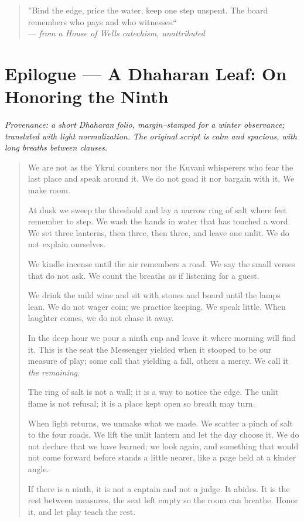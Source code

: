 \documentclass[11pt]{article}
\numberwithin{equation}{section} %
\theoremstyle{plain} %
\theoremstyle{definition} %
\theoremstyle{remark} %
\begin{document}
\medskip
\begin{quote}\small
''Bind the edge, price the water, keep one step unspent. The board remembers who pays and who witnesses.``\\
\hfill --- \textit{from a House of Wells catechism, unattributed}
\end{quote}


\clearpage
\section*{Epilogue --- A Dhaharan Leaf: On Honoring the Ninth}
\label{epilogue:dhahara-ninth}
{}

\noindent\textit{Provenance: a short Dhaharan folio, margin--stamped for a winter observance; translated with light normalization. The original script is calm and spacious, with long breaths between clauses.}

\medskip
\begin{quote}\small
We are not as the Ykrul counters nor the Kuvani whisperers who fear the last place and speak around it. We do not goad it nor bargain with it. We make room.

At dusk we sweep the threshold and lay a narrow ring of salt where feet remember to step. We wash the hands in water that has touched a word. We set three lanterns, then three, then three, and leave one unlit. We do not explain ourselves.

We kindle incense until the air remembers a road. We say the small verses that do not ask. We count the breaths as if listening for a guest.

We drink the mild wine and sit with stones and board until the lamps lean. We do not wager coin; we practice keeping. We speak little. When laughter comes, we do not chase it away.

In the deep hour we pour a ninth cup and leave it where morning will find it. This is the seat the Messenger yielded when it stooped to be our measure of play; some call that yielding a fall, others a mercy. We call it \emph{the remaining}.

The ring of salt is not a wall; it is a way to notice the edge. The unlit flame is not refusal; it is a place kept open so breath may turn.

When light returns, we unmake what we made. We scatter a pinch of salt to the four roads. We lift the unlit lantern and let the day choose it. We do not declare that we have learned; we look again, and something that would not come forward before stands a little nearer, like a page held at a kinder angle.

If there is a ninth, it is not a captain and not a judge. It abides. It is the rest between measures, the seat left empty so the room can breathe. Honor it, and let play teach the rest.
\end{quote}
\end{document}
